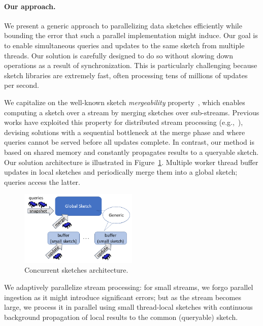 \paragraph{Our approach.}
We present a generic approach to parallelizing data sketches efficiently while bounding the error that such a parallel implementation might induce. Our goal is to enable simultaneous queries and updates to the same sketch from multiple threads. Our solution is carefully designed to do so without slowing down operations as a result of synchronization.
This is particularly challenging because sketch libraries are extremely fast, often processing tens of millions of updates per second. 

We capitalize on the well-known sketch \emph{mergeability} property~\cite{Cormode:2017}, which enables computing a sketch 
over a stream by merging sketches over sub-streams. Previous works have exploited this property for distributed 
stream processing (e.g.,~\cite{heule2013hyperloglog, cormode2011algorithms}), devising solutions with a sequential bottleneck at the merge phase and where queries cannot
be served before all updates complete. 
In contrast, our method is based on shared memory and constantly propagates results to a queryable sketch.
Our solution architecture is illustrated in Figure~\ref{fc-fig:arch}. Multiple worker thread buffer updates in local sketches and periodically merge them into a global sketch; queries access the latter. 

\begin{figure}[htb]
  \begin{center}
    \includegraphics[width=0.5\textwidth]{graphics/fast-concurrent/arch-crop.png}
  \end{center}
  \caption{Concurrent sketches architecture.}
  \label{fc-fig:arch}
\end{figure}


We adaptively parallelize  stream processing:  
for small streams, we forgo parallel ingestion as it might introduce significant errors;  
but as the stream becomes large, we process it in parallel using small
thread-local sketches with continuous background propagation of local results to the common (queryable) sketch.

